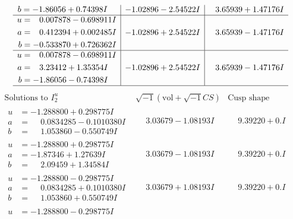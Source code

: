 \documentclass[1p]{elsarticle_modified}
\theoremstyle{definition}
\newcommand{\I}{\sqrt{-1}}
\begin{document}
$$\begin{array}{c|c|c}
\begin{aligned}
b &= -1.86056 + 0.74398 I\end{aligned}
 & -1.02896 - 2.54522 I & \phantom{-}3.65939 + 1.47176 I \\ \hline\begin{aligned}
u &= \phantom{-}0.007878 - 0.698911 I \\
a &= \phantom{-}0.412394 + 0.002485 I \\
b &= -0.533870 + 0.726362 I\end{aligned}
 & -1.02896 + 2.54522 I & \phantom{-}3.65939 - 1.47176 I \\ \hline\begin{aligned}
u &= \phantom{-}0.007878 - 0.698911 I \\
a &= \phantom{-}3.23412 + 1.35354 I \\
b &= -1.86056 - 0.74398 I\end{aligned}
 & -1.02896 + 2.54522 I & \phantom{-}3.65939 - 1.47176 I\\
 \hline 
 \end{array}$$\newpage$$\begin{array}{c|c|c}  
\text{Solutions to }I^u_{2}& \I (\text{vol} + \sqrt{-1}CS) & \text{Cusp shape}\\
 \hline 
\begin{aligned}
u &= -1.288800 + 0.298775 I \\
a &= \phantom{-}0.0834285 - 0.1010380 I \\
b &= \phantom{-}1.053860 - 0.550749 I\end{aligned}
 & \phantom{-}3.03679 - 1.08193 I & \phantom{-}9.39220 + 0. I\phantom{ +0.000000I} \\ \hline\begin{aligned}
u &= -1.288800 + 0.298775 I \\
a &= -1.87346 + 1.27639 I \\
b &= \phantom{-}2.09459 + 1.34584 I\end{aligned}
 & \phantom{-}3.03679 - 1.08193 I & \phantom{-}9.39220 + 0. I\phantom{ +0.000000I} \\ \hline\begin{aligned}
u &= -1.288800 - 0.298775 I \\
a &= \phantom{-}0.0834285 + 0.1010380 I \\
b &= \phantom{-}1.053860 + 0.550749 I\end{aligned}
 & \phantom{-}3.03679 + 1.08193 I & \phantom{-}9.39220 + 0. I\phantom{ +0.000000I} \\ \hline\begin{aligned}
u &= -1.288800 - 0.298775 I \\

\end{aligned}
\end{array}$$
\end{document}
